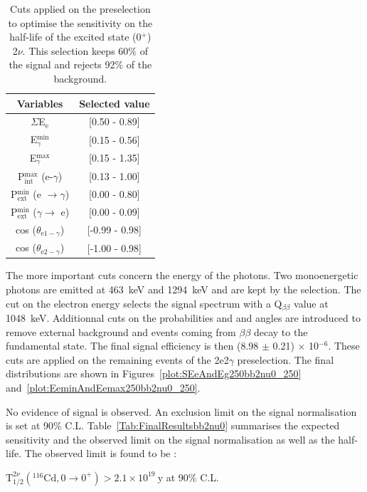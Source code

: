 \documentclass[main.tex]{subfiles}
\begin{document}
\begin{table}[h!]
\centering
\begin{tabular}{c|c}
Variables & Selected value \\
\toprule
$\Sigma$E$_{\text{e}}$ & [0.50 - 0.89] \\
E$_{\gamma}^{\text{min}}$    & [0.15 - 0.56] \\
E$_{\gamma}^{\text{max}}$    & [0.15 - 1.35] \\
P$_{\text{int}}^{\text{max}}$ (e-$\gamma$) & [0.13 - 1.00] \\
P$_{\text{ext}}^{\text{min}}$ (e $\rightarrow \gamma$) & [0.00 - 0.80] \\
P$_{\text{ext}}^{\text{min}}$ ($\gamma \rightarrow$ e) & [0.00 - 0.09] \\
cos ($\theta_{\text{e1}-\gamma}$) & [-0.99 - 0.98] \\
cos ($\theta_{\text{e2}-\gamma}$) & [-1.00 - 0.98] \\
\bottomrule
\end{tabular}
\caption{Cuts applied on the preselection to optimise the sensitivity on the half-life of the excited state (0$^+$) 2$\nu$. This selection keeps 60\% of the signal and rejects 92\% of the background.}
\label{tab:Cuts2nu0Plus250keV}
\end{table}


\bigskip


\NI The more important cuts concern the energy of the photons. Two monoenergetic photons are emitted at 463~keV and 1294~keV and are kept by the selection. The cut on the electron energy selects the signal spectrum with a Q$_{\beta\beta}$ value at 1048~keV. Additionnal cuts on the probabilities and and angles are introduced to remove external background and events coming from $\beta\beta$ decay to the fundamental state. The final signal efficiency is then (8.98 $\pm$ 0.21) $\times$ 10$^{-\text{6}}$. These cuts are applied on the remaining events of the 2e2$\gamma$ preselection. The final distributions are shown in Figures~\ref{plot:SEeAndEg250bb2nu0_250} and~\ref{plot:EeminAndEemax250bb2nu0_250}. 


\bigskip


\NI No evidence of signal is observed. An exclusion limit on the signal normalisation is set at 90\% C.L. Table~\ref{Tab:FinalResultsbb2nu0} summarises the expected sensitivity and the observed limit on the signal normalisation as well as the half-life. The observed limit is found to be : 


\begin{center}
$ \text{T}_{\text{1/2}}^{\text{2}\nu} (^{\text{116}} \text{Cd}, \text{0} \rightarrow \text{0}^{+}) > \text{2.1} \times \text{10}^{\text{19}}~\text{y}$ at 90\% C.L.
\end{center}
\end{document}
